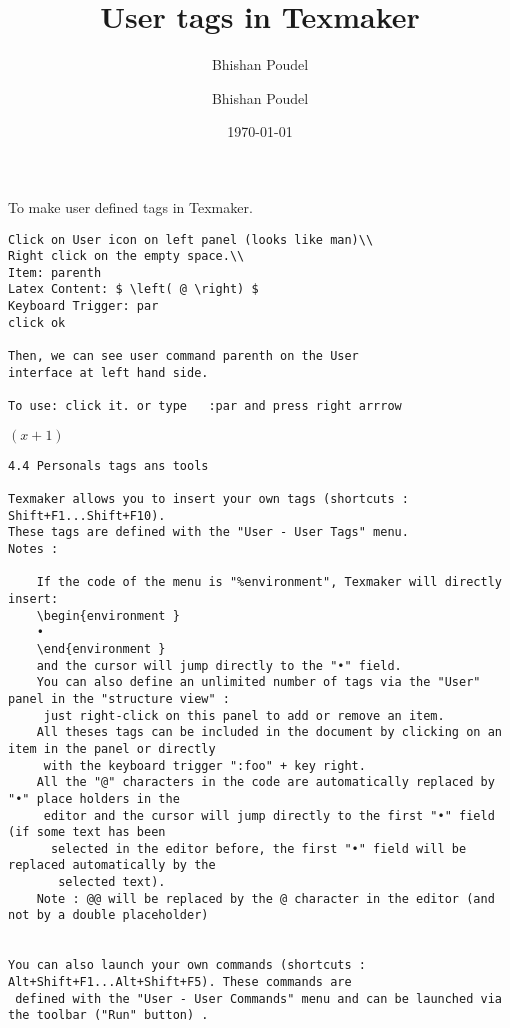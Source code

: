 \documentclass[10 pt, a4paper] {article}
\title{User tags in Texmaker}
\author{Bhishan Poudel}
\date{\today}
\author{Bhishan Poudel}
\begin{document}
\maketitle{}
To make user defined tags in Texmaker.
\begin{verbatim}
Click on User icon on left panel (looks like man)\\
Right click on the empty space.\\
Item: parenth
Latex Content: $ \left( @ \right) $ 
Keyboard Trigger: par
click ok

Then, we can see user command parenth on the User
interface at left hand side.

To use: click it. or type   :par and press right arrrow  
\end{verbatim}
$ \left( x +1 \right) $ 


\begin{verbatim}
4.4 Personals tags ans tools

Texmaker allows you to insert your own tags (shortcuts : Shift+F1...Shift+F10). 
These tags are defined with the "User - User Tags" menu.
Notes :

    If the code of the menu is "%environment", Texmaker will directly insert:
    \begin{environment }
    •
    \end{environment }
    and the cursor will jump directly to the "•" field.
    You can also define an unlimited number of tags via the "User" panel in the "structure view" :
     just right-click on this panel to add or remove an item.
    All theses tags can be included in the document by clicking on an item in the panel or directly
     with the keyboard trigger ":foo" + key right.
    All the "@" characters in the code are automatically replaced by "•" place holders in the
     editor and the cursor will jump directly to the first "•" field (if some text has been
      selected in the editor before, the first "•" field will be replaced automatically by the
       selected text).
    Note : @@ will be replaced by the @ character in the editor (and not by a double placeholder)
    

You can also launch your own commands (shortcuts : Alt+Shift+F1...Alt+Shift+F5). These commands are
 defined with the "User - User Commands" menu and can be launched via the toolbar ("Run" button) .
 
\end{verbatim}
\end{document}
